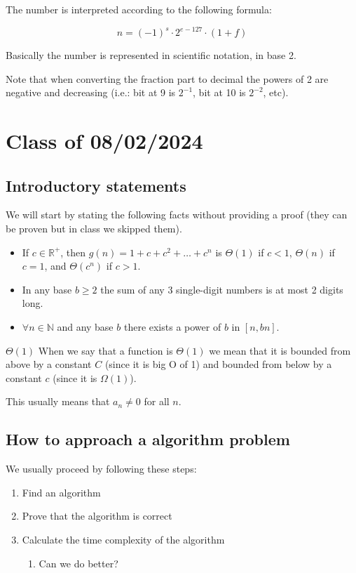 \documentclass[10pt]{extarticle}
\newcommand{\R}{\mathbb{R}}
\newcommand{\N}{\mathbb{N}}
\begin{document}
The number is interpreted according to the following formula:

$$
    n = (-1)^s \cdot 2^{e - 127} \cdot (1 + f)
$$

Basically the number is represented in scientific notation, in base 2.

Note that when converting the fraction part to decimal the powers of 2 are negative and decreasing
(i.e.: bit at 9 is $2^{-1}$, bit at 10 is $2^{-2}$, etc).

\section{Class of 08/02/2024}

\subsection{Introductory statements}

We will start by stating the following facts without providing a proof (they can be proven but in class we skipped them).

\begin{itemize}
    \item If $c \in \R^+$, then $g(n) = 1 + c + c^2 + \dots + c^n$ is $\Theta(1)$ if $c < 1$, $\Theta(n)$ if $c = 1$, and $\Theta(c^n)$ if $c > 1$.
    \item In any base $b \ge 2$ the sum of any 3 single-digit numbers is at most 2 digits long.
    \item $\forall n \in \N$ and any base $b$ there exists a power of $b$ in $[n, bn].$
\end{itemize}

\begin{notebox}{$\Theta(1)$}
    When we say that a function is $\Theta(1)$ we mean that it is bounded from above by a constant $C$ (since it is big O of 1)
    and bounded from below by a constant $c$ (since it is $\Omega(1)$).

    This usually means that $a_n \ne 0$ for all $n$.
\end{notebox}

\subsection{How to approach a algorithm problem}

We usually proceed by following these steps:
\begin{enumerate}
    \item Find an algorithm
    \item Prove that the algorithm is correct
    \item Calculate the time complexity of the algorithm
          \begin{enumerate}
              \item Can we do better?
          \end{enumerate}
\end{enumerate}
\end{document}
